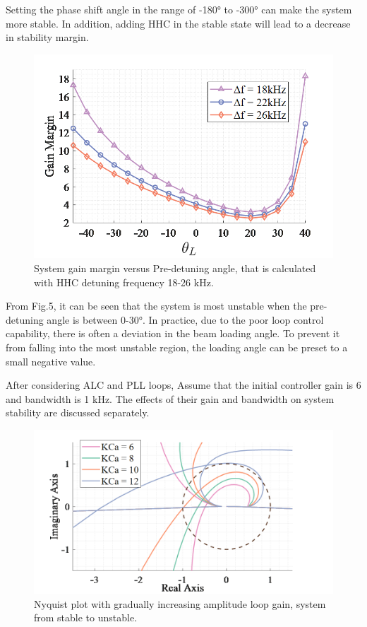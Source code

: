\documentclass[letterpaper,
               nospread,     %
               ]{jacow}
\begin{document}
Setting the phase shift angle in the range of -180° to -300° can make the system
more stable. In addition, adding HHC in the stable state will lead to a decrease in stability margin.
\begin{figure}[!htb]
   \centering
   \includegraphics*[width=0.7\columnwidth]{THPA037_f5}
   \caption{System gain margin versus Pre-detuning angle, that is calculated with HHC detuning frequency 18-26 kHz.}
   \label{fig:paper_layout}
\end{figure}

From Fig.5, it can be seen that the system is most unstable when the
pre-detuning angle is between 0-30°. In practice, due to the poor loop
control capability, there is often a deviation in the beam loading angle.
To prevent it from falling into the most unstable region, the loading
angle can be preset to a small negative value.

After considering ALC and PLL loops, Assume that the initial controller gain is
6 and bandwidth is 1 kHz. The effects of their gain and bandwidth on system stability are discussed separately\cite{ref14}.
\begin{figure}[!htb]
   \centering
   \includegraphics*[width=0.8\columnwidth]{THPA037_f6}
   \caption{Nyquist plot with gradually increasing amplitude loop gain, system from stable to unstable.}
   \label{fig:paper_layout}
\end{figure}
\end{document}
